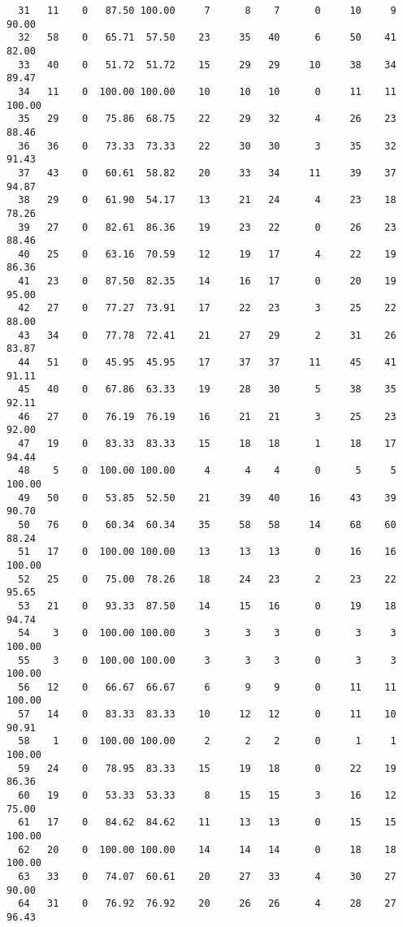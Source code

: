 \begin{verbatim}
  31   11    0   87.50 100.00     7      8    7      0     10     9    90.00
  32   58    0   65.71  57.50    23     35   40      6     50    41    82.00
  33   40    0   51.72  51.72    15     29   29     10     38    34    89.47
  34   11    0  100.00 100.00    10     10   10      0     11    11   100.00
  35   29    0   75.86  68.75    22     29   32      4     26    23    88.46
  36   36    0   73.33  73.33    22     30   30      3     35    32    91.43
  37   43    0   60.61  58.82    20     33   34     11     39    37    94.87
  38   29    0   61.90  54.17    13     21   24      4     23    18    78.26
  39   27    0   82.61  86.36    19     23   22      0     26    23    88.46
  40   25    0   63.16  70.59    12     19   17      4     22    19    86.36
  41   23    0   87.50  82.35    14     16   17      0     20    19    95.00
  42   27    0   77.27  73.91    17     22   23      3     25    22    88.00
  43   34    0   77.78  72.41    21     27   29      2     31    26    83.87
  44   51    0   45.95  45.95    17     37   37     11     45    41    91.11
  45   40    0   67.86  63.33    19     28   30      5     38    35    92.11
  46   27    0   76.19  76.19    16     21   21      3     25    23    92.00
  47   19    0   83.33  83.33    15     18   18      1     18    17    94.44
  48    5    0  100.00 100.00     4      4    4      0      5     5   100.00
  49   50    0   53.85  52.50    21     39   40     16     43    39    90.70
  50   76    0   60.34  60.34    35     58   58     14     68    60    88.24
  51   17    0  100.00 100.00    13     13   13      0     16    16   100.00
  52   25    0   75.00  78.26    18     24   23      2     23    22    95.65
  53   21    0   93.33  87.50    14     15   16      0     19    18    94.74
  54    3    0  100.00 100.00     3      3    3      0      3     3   100.00
  55    3    0  100.00 100.00     3      3    3      0      3     3   100.00
  56   12    0   66.67  66.67     6      9    9      0     11    11   100.00
  57   14    0   83.33  83.33    10     12   12      0     11    10    90.91
  58    1    0  100.00 100.00     2      2    2      0      1     1   100.00
  59   24    0   78.95  83.33    15     19   18      0     22    19    86.36
  60   19    0   53.33  53.33     8     15   15      3     16    12    75.00
  61   17    0   84.62  84.62    11     13   13      0     15    15   100.00
  62   20    0  100.00 100.00    14     14   14      0     18    18   100.00
  63   33    0   74.07  60.61    20     27   33      4     30    27    90.00
  64   31    0   76.92  76.92    20     26   26      4     28    27    96.43

\end{verbatim}
